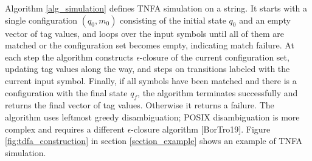 \documentclass[]{article}
\begin{document}
Algorithm \ref{alg_simulation} defines TNFA simulation on a string.
It starts with a single configuration $(q_0, m_0)$ consisting of the initial state $q_0$ and an empty vector of tag values,
and loops over the input symbols until all of them are matched or the configuration set becomes empty, indicating match failure.
At each step the algorithm constructs $\epsilon$-closure of the current configuration set, updating tag values along the way, and steps on transitions labeled with the current input symbol.
Finally, if all symbols have been matched and there is a configuration with the final state $q_f$, the algorithm terminates successfully and returns the final vector of tag values.
Otherwise it returns a failure.
The algorithm uses leftmost greedy disambiguation; POSIX disambiguation is more complex and requires a different $\epsilon$-closure algorithm [BorTro19].
Figure \ref{fig:tdfa_construction} in section \ref{section_example} shows an example of TNFA simulation.

\end{document}
